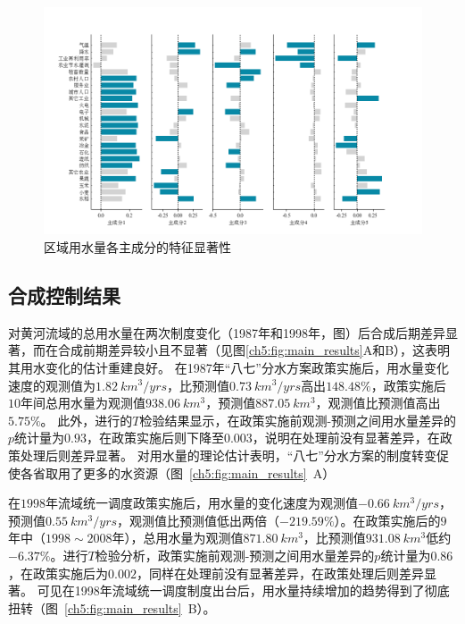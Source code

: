 \begin{figure}[htb]
    \centering
    \includegraphics[width=\textwidth]{img/ch5/ch5_variables.png}
    \caption{区域用水量各主成分的特征显著性}\label{ch5:fig:variables}
\end{figure}

\subsection{合成控制结果}\label{result-2}

对黄河流域的总用水量在两次制度变化（1987年和1998年，图）后合成后期差异显著，而在合成前期差异较小且不显著（见图\ref{ch5:fig:main_results}A和B），这表明其用水变化的估计重建良好。
在1987年“八七”分水方案政策实施后，用水量变化速度的观测值为$1.82~km^3/yrs$，比预测值$0.73~km^3/yrs$高出$148.48\%$，政策实施后$10$年间总用水量为观测值$938.06~km^3$，预测值$887.05~km^3$，观测值比预测值高出$5.75\%$。
此外，进行的$T$检验结果显示，在政策实施前观测-预测之间用水量差异的$p$统计量为$0.93$，在政策实施后则下降至$0.003$，说明在处理前没有显著差异，在政策处理后则差异显著。
对用水量的理论估计表明，“八七”分水方案的制度转变促使各省取用了更多的水资源（图~\ref{ch5:fig:main_results}~A）

在$1998$年流域统一调度政策实施后，用水量的变化速度为观测值$-0.66~km^3/yrs$，预测值$0.55~km^3/yrs$，观测值比预测值低出两倍（$-219.59\%$）。在政策实施后的$9$年中（$1998 \sim 2008$年），总用水量为观测值$871.80~km^3$，比预测值$931.08~km^3$低约$-6.37\%$。进行$T$检验分析，政策实施前观测-预测之间用水量差异的$p$统计量为$0.86$，在政策实施后为$0.002$，同样在处理前没有显著差异，在政策处理后则差异显著。
可见在1998年流域统一调度制度出台后，用水量持续增加的趋势得到了彻底扭转（图~\ref{ch5:fig:main_results}~B）。

